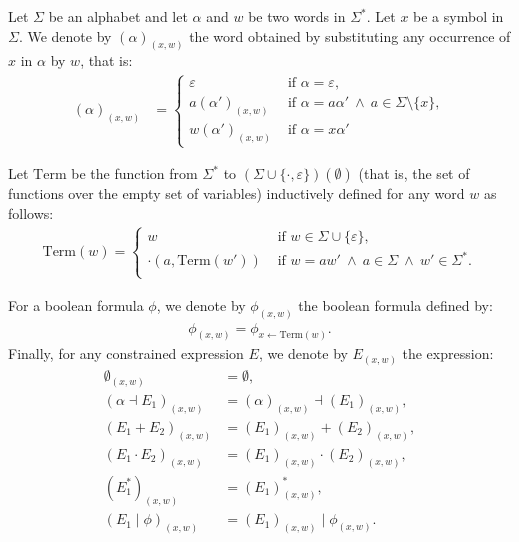\documentclass[a4paper]{llncs}
\begin{document}
  Let $\Sigma$ be an alphabet and let $\alpha$ and $w$ be two words in $\Sigma^*$. Let $x$ be a symbol in $\Sigma$. We denote by $(\alpha)_{(x,w)}$ the word obtained by substituting any occurrence of $x$ in $\alpha$ by $w$, that is:
  \begin{align*}
    (\alpha)_{(x,w)}&=
      \begin{cases}
          \varepsilon & \text{ if }\alpha=\varepsilon,\\
          a(\alpha')_{(x,w)} & \text{ if }\alpha=a\alpha'\ \wedge\ a\in\Sigma\setminus\{x\},\\
          w(\alpha')_{(x,w)} & \text{ if }\alpha=x\alpha'
      \end{cases}
  \end{align*}
    \begin{definition}
     Let $\mathrm{Term}$ be the function from $\Sigma^*$ to $(\Sigma\cup\{\cdot,\varepsilon\})(\emptyset)$ (that is, the set of functions over the empty set of variables) inductively defined for any word $w$ as follows:
        \begin{align*}
        \mathrm{Term}(w)=
        \begin{cases}
            w & \text{ if } w\in\Sigma\cup\{\varepsilon\},\\
            \cdot(a,\mathrm{Term}(w')) & \text{ if }w=aw'\ \wedge\ a\in\Sigma\ \wedge\ w'\in\Sigma^*.\\
          \end{cases}
        \end{align*}
  \end{definition}
  For a boolean formula $\phi$, we denote by $\phi_{(x,w)}$ the boolean formula defined by:  
  \begin{align*}
      \phi_{(x,w)}=\phi_{x\leftarrow \mathrm{Term}(w)}.
  \end{align*}
  Finally, for any constrained expression $E$, we denote by $E_{(x,w)}$ the expression:
  \begin{align*}
    \emptyset_{(x,w)}&=\emptyset,\\
    (\alpha\dashv E_1)_{(x,w)}&=(\alpha)_{(x,w)}\dashv (E_1)_{(x,w)},\\
    (E_1+E_2)_{(x,w)}&=(E_1)_{(x,w)}+(E_2)_{(x,w)},\\
    (E_1\cdot E_2)_{(x,w)}&=(E_1)_{(x,w)}\cdot(E_2)_{(x,w)},\\
    (E_1^*)_{(x,w)}&=(E_1)_{(x,w)}^*,\\
    (E_1\mid\phi)_{(x,w)}&=(E_1)_{(x,w)}\mid \phi_{(x,w)}.
  \end{align*}
\end{document}
